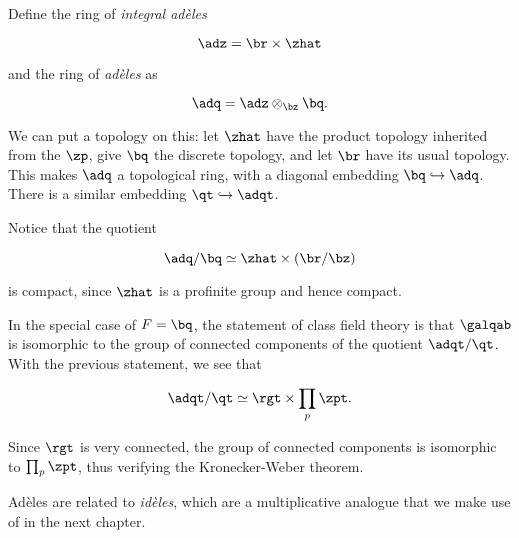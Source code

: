Define the ring of \textit{integral ad\`eles}

\[ \adz = \br \times \zhat \]

and the ring of \textit{ad\`eles} as

\[ \adq = \adz \otimes_\bz \bq. \]

We can put a topology on this: let $\zhat$ have the product topology inherited
from the $\zp$, give $\bq$ the discrete topology, and let $\br$ have its usual
topology. This makes $\adq$ a topological ring, with a diagonal embedding
$\bq\hookrightarrow\adq$. There is a similar embedding $\qt \hookrightarrow \adqt$.

Notice that the quotient

\[ \adq/\bq \simeq \zhat \times (\br/\bz) \]

is compact, since $\zhat$ is a profinite group and hence compact.

In the special case of $F=\bq$, the statement of class field theory is that
$\galqab$ is isomorphic to the group of connected components of the quotient
$\adqt/\qt$. With the previous statement, we see that

\[ \adqt/
  \qt
  \simeq \rgt \times \prod_p \zpt. \]

Since $\rgt$ is very connected, the group of connected components is isomorphic
to $\prod_p \zpt$, thus verifying the Kronecker-Weber theorem.

Ad\`eles are related to \textit{id\`eles}, which are a multiplicative analogue that
we make use of in the next chapter.


